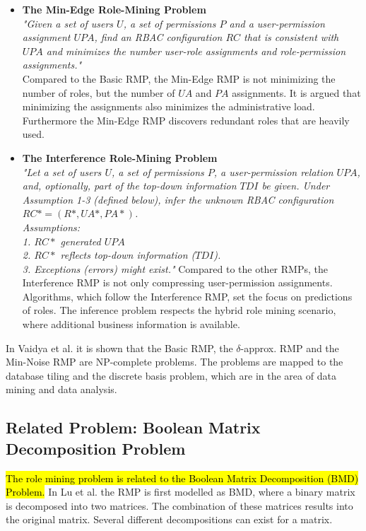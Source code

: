 \begin{itemize}
        \item \textbf{The Min-Edge Role-Mining Problem}\cite{Vaidya:2009}\\
        \textit{"Given a set of users $U$, a set of permissions $P$ and a user-permission assignment $UPA$, find an RBAC configuration $RC$ that is consistent with $UPA$ and minimizes the number user-role assignments and role-permission assignments."}\\
        Compared to the Basic RMP, the Min-Edge RMP is not minimizing the number of roles, but the number of $UA$ and $PA$ assignments. It is argued that minimizing the assignments also minimizes the administrative load. Furthermore the Min-Edge RMP discovers redundant roles that are heavily used\cite{4497438}.
        
        \item \textbf{The Interference Role-Mining Problem}\cite{Frank:2013}\\
        \textit{"Let a set of users $U$, a set of permissions $P$, a user-permission relation $UPA$, and, optionally, part of the top-down information $TDI$ be given. Under Assumption 1-3 (defined below), infer the unknown RBAC configuration $RC*=(R*, UA*, PA*)$.\\
        Assumptions:\\
        1. $RC*$ generated $UPA$\\
        2. $RC*$ reflects top-down information ($TDI$).\\
        3. Exceptions (errors) might exist."}
	    Compared to the other RMPs, the Interference RMP is not only compressing user-permission assignments. Algorithms, which follow the Interference RMP, set the focus on predictions of roles. The inference problem respects the hybrid role mining scenario, where additional business information is available.  
    \end{itemize}
    
    In Vaidya et al.\cite{Vaidya:2007} it is shown that the Basic RMP, the $\delta$-approx. RMP and the Min-Noise RMP are NP-complete problems. The problems are mapped to the database tiling and the discrete basis problem, which are in the area of data mining and data analysis.
    
    \subsection{Related Problem: Boolean Matrix Decomposition Problem}
    \label{sec:BMD-Problem}
    \hl{The role mining problem is related to the Boolean Matrix Decomposition (BMD) Problem.} In Lu et al.\cite{4497438} the RMP is first modelled as BMD, where a binary matrix is decomposed into two matrices. The combination of these matrices results into the original matrix. Several different decompositions can exist for a matrix.
    
